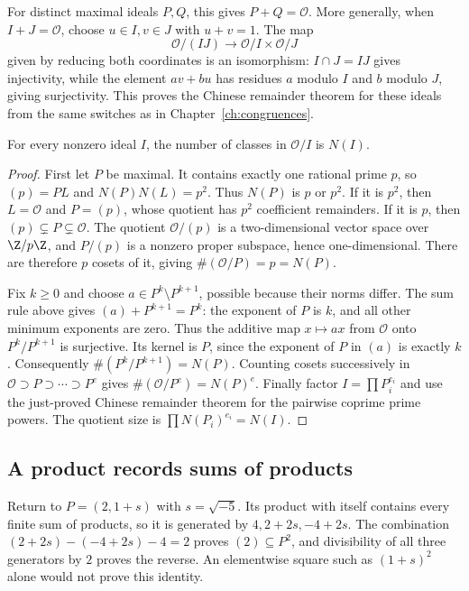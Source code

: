 For distinct maximal ideals $P,Q$, this gives $P+Q=\mathcal O$.
More generally, when $I+J=\mathcal O$, choose $u\in I,v\in J$
with $u+v=1$. The map
\[
\mathcal O/(IJ)\longrightarrow\mathcal O/I\times\mathcal O/J
\]
given by reducing both coordinates is an isomorphism:
$I\cap J=IJ$ gives injectivity, while the element $av+bu$
has residues $a$ modulo $I$ and $b$ modulo $J$, giving surjectivity.
This proves the Chinese remainder theorem for these ideals from the
same switches as in Chapter~\ref{ch:congruences}.

\begin{proposition}\label{prop:t1-norm-index}
For every nonzero ideal $I$, the number of classes in $\mathcal O/I$
is $N(I)$.
\end{proposition}
\begin{proof}
First let $P$ be maximal. It contains exactly one rational prime $p$,
so $(p)=PL$ and $N(P)N(L)=p^2$. Thus $N(P)$ is $p$ or $p^2$.
If it is $p^2$, then $L=\mathcal O$ and $P=(p)$, whose quotient has
$p^2$ coefficient remainders. If it is $p$, then
$(p)\subsetneq P\subsetneq\mathcal O$. The quotient
$\mathcal O/(p)$ is a two-dimensional vector space over $\Z/p\Z$,
and $P/(p)$ is a nonzero proper subspace, hence one-dimensional.
There are therefore $p$ cosets of it, giving
$\#(\mathcal O/P)=p=N(P)$.

Fix $k\ge0$ and choose $a\in P^k\setminus P^{k+1}$, possible because
their norms differ. The sum rule above gives
$(a)+P^{k+1}=P^k$: the exponent of $P$ is $k$, and all other
minimum exponents are zero. Thus the additive map
$x\mapsto ax$ from $\mathcal O$ onto $P^k/P^{k+1}$
is surjective. Its kernel is $P$, since the exponent of $P$
in $(a)$ is exactly $k$. Consequently
$\#(P^k/P^{k+1})=N(P)$.
Counting cosets successively in
$\mathcal O\supset P\supset\cdots\supset P^e$ gives
$\#(\mathcal O/P^e)=N(P)^e$.
Finally factor $I=\prod P_i^{e_i}$ and use the just-proved
Chinese remainder theorem for the pairwise coprime prime powers.
The quotient size is $\prod N(P_i)^{e_i}=N(I)$.
\end{proof}

\subsection*{A product records sums of products}
Return to $P=(2,1+s)$ with $s=\sqrt{-5}$.
Its product with itself contains every finite sum of products,
so it is generated by $4,2+2s,-4+2s$.
The combination
$(2+2s)-(-4+2s)-4=2$ proves $(2)\subseteq P^2$,
and divisibility of all three generators by $2$ proves the reverse.
An elementwise square such as $(1+s)^2$ alone would not prove this identity.

